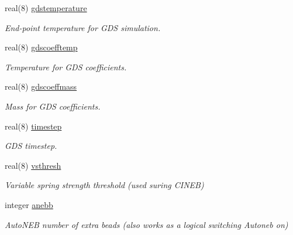 \begin{DoxyCompactItemize}
real(8) \mbox{\hyperlink{namespaceglobaldata_a31f5739ae1cbd76deff375eb7de1f132}{gdstemperature}}
\begin{DoxyCompactList}\small\item\em End-\/point temperature for G\+DS simulation. \end{DoxyCompactList}\item 
\mbox{\label{namespaceglobaldata_ad2dd4073ea0a88a30a20028a04e2e348}} 
real(8) \mbox{\hyperlink{namespaceglobaldata_ad2dd4073ea0a88a30a20028a04e2e348}{gdscoefftemp}}
\begin{DoxyCompactList}\small\item\em Temperature for G\+DS coefficients. \end{DoxyCompactList}\item 
\mbox{\label{namespaceglobaldata_a20c912d009e0e7529e2615aa21b12398}} 
real(8) \mbox{\hyperlink{namespaceglobaldata_a20c912d009e0e7529e2615aa21b12398}{gdscoeffmass}}
\begin{DoxyCompactList}\small\item\em Mass for G\+DS coefficients. \end{DoxyCompactList}\item 
\mbox{\label{namespaceglobaldata_aa246e6695206f823e0d2e9e6ecf3c694}} 
real(8) \mbox{\hyperlink{namespaceglobaldata_aa246e6695206f823e0d2e9e6ecf3c694}{timestep}}
\begin{DoxyCompactList}\small\item\em G\+DS timestep. \end{DoxyCompactList}\item 
\mbox{\label{namespaceglobaldata_a5b3ea766ff641a08d2a09089b71705cc}} 
real(8) \mbox{\hyperlink{namespaceglobaldata_a5b3ea766ff641a08d2a09089b71705cc}{vsthresh}}
\begin{DoxyCompactList}\small\item\em Variable spring strength threshold (used suring C\+I\+N\+EB) \end{DoxyCompactList}\item 
\mbox{\label{namespaceglobaldata_a444f514910c5a8aeb425d56056b72e69}} 
integer \mbox{\hyperlink{namespaceglobaldata_a444f514910c5a8aeb425d56056b72e69}{anebb}}
\begin{DoxyCompactList}\small\item\em Auto\+N\+EB number of extra beads (also works as a logical switching Autoneb on) \end{DoxyCompactList}\item 

\end{DoxyCompactItemize}
